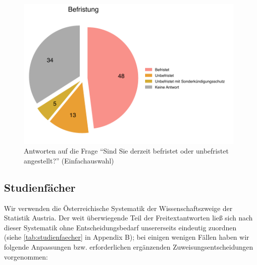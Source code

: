 \documentclass{scrartcl}
\begin{document}
\begin{figure}[ht]
   \includegraphics[width=1\textwidth]{befristung.pdf}
   \caption{Antworten auf die Frage \enquote{Sind Sie derzeit befristet oder unbefristet angestellt?} (Einfachauswahl)}
   \label{fig:befristung}
\end{figure}


\subsection{Studienfächer}\label{sec:resultate_studienfaecher}
Wir verwenden die Österreichische Systematik der Wissenschaftszweige der Statistik Austria.\autocite[Vgl.][]{statistik_austria_schlagwortverzeichnis_2023}
Der weit überwiegende Teil der Freitextantworten ließ sich nach dieser Systematik ohne Entscheidungsbedarf unsererseits eindeutig zuordnen (siehe \autoref{tab:studienfaecher} in Appendix B); bei einigen wenigen Fällen haben wir folgende Anpassungen bzw. erforderlichen ergänzenden Zuweisungsentscheidungen vorgenommen:
\end{document}
